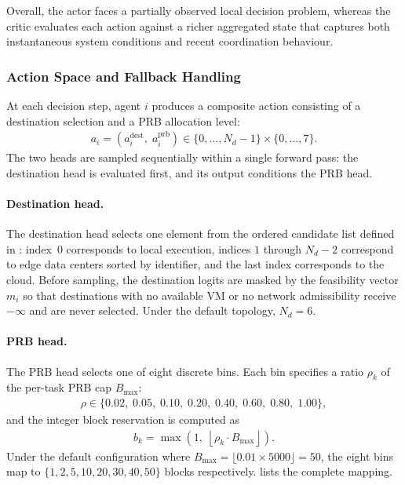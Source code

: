 Overall, the actor faces a partially observed local decision problem, whereas the critic evaluates each action against a richer aggregated state that captures both instantaneous system conditions and recent coordination behaviour.

\FloatBarrier

\subsubsection{Action Space and Fallback Handling}
\label{subsec:action-space}

At each decision step, agent \(i\) produces a composite action consisting of a destination selection and a PRB allocation level:
\begin{align}
a_i = \left(a_i^{\mathrm{dest}},\; a_i^{\mathrm{prb}}\right)
\in \{0, \dots, N_d - 1\} \times \{0, \dots, 7\}.
\end{align}
The two heads are sampled sequentially within a single forward pass: the destination head is evaluated first, and its output conditions the PRB head.

\paragraph{Destination head.}
The destination head selects one element from the ordered candidate list defined in : index~0 corresponds to local execution, indices \(1\) through \(N_d{-}2\) correspond to edge data centers sorted by identifier, and the last index corresponds to the cloud. Before sampling, the destination logits are masked by the feasibility vector \(m_i\) so that destinations with no available VM or no network admissibility receive \(-\infty\) and are never selected. Under the default topology, \(N_d = 6\).

\paragraph{PRB head.}
The PRB head selects one of eight discrete bins. Each bin specifies a ratio \(\rho_k\) of the per-task PRB cap \(B_{\max}\):
\begin{align}
\rho \in \{0.02,\; 0.05,\; 0.10,\; 0.20,\; 0.40,\; 0.60,\; 0.80,\; 1.00\},
\end{align}
and the integer block reservation is computed as
\begin{align}
b_k = \max\!\left(1,\; \left\lfloor \rho_k \cdot B_{\max} \right\rfloor\right).
\label{eq:prb-mapping}
\end{align}
Under the default configuration where \(B_{\max} = \lfloor 0.01 \times 5000 \rfloor = 50\), the eight bins map to \(\{1, 2, 5, 10, 20, 30, 40, 50\}\) blocks respectively.  lists the complete mapping.

